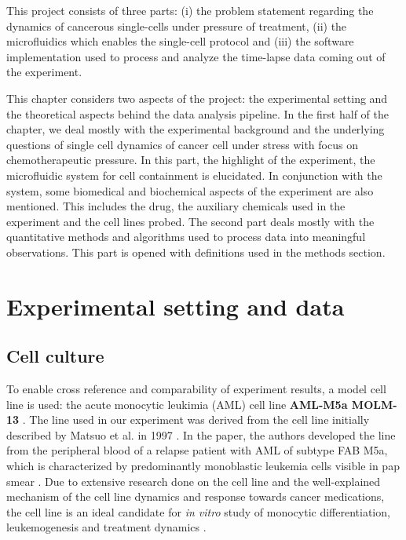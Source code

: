 \documentclass[pdftex,12pt,a4paper]{report}
\begin{document}
\label{chapter:data_and_method}

This project consists of three parts: (i) the problem statement regarding the dynamics of cancerous single-cells under pressure of treatment, (ii) the microfluidics which enables the single-cell protocol and (iii) the software implementation used to process and analyze the time-lapse data coming out of the experiment.

This chapter considers two aspects of the project: the experimental setting and the theoretical aspects behind the data analysis pipeline. In the first half of the chapter, we deal mostly with the experimental background and the underlying questions of single cell dynamics of cancer cell under stress with focus on chemotherapeutic pressure. In this part, the highlight of the experiment, the microfluidic system for cell containment is elucidated. In conjunction with the system, some biomedical and biochemical aspects of the experiment are also mentioned. This includes the drug, the auxiliary chemicals used in the experiment and the cell lines probed. The second part deals mostly with the quantitative methods and algorithms used to process data into meaningful observations. This part is opened with definitions used in the methods section.

\section{Experimental setting and data}

\subsection{Cell culture}
\label{subsection:cell_culture}

To enable cross reference and comparability of experiment results, a model cell line is used: the acute monocytic leukimia (AML) cell line \textbf{AML-M5a MOLM-13} \cite{matsuo1997two}. The line used in our experiment was derived from the cell line initially described by Matsuo et al. in 1997 \cite{matsuo1997two}. In the paper, the authors developed the line from the peripheral blood of a relapse patient with AML of subtype FAB M5a, which is characterized by predominantly monoblastic leukemia cells visible in pap smear \cite{arber20162016}. Due to extensive research done on the cell line and the well-explained mechanism of the cell line dynamics and response towards cancer medications, the cell line is an ideal candidate for \textit{in vitro} study of monocytic differentiation, leukemogenesis and treatment dynamics \cite{matsuo1997two, kelly2002ct53518, yokota1997internal}.
\end{document}
